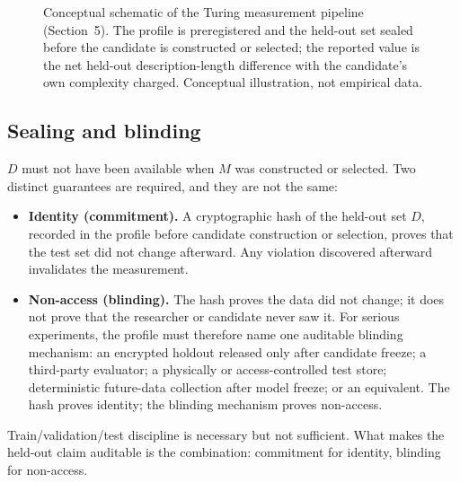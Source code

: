 \documentclass[11pt]{article}
\begin{document}
\begin{figure}[htbp]
\centering
{}
\caption{Conceptual schematic of the Turing measurement pipeline (Section~5). The profile is preregistered and the held-out set sealed before the candidate is constructed or selected; the reported value is the net held-out description-length difference with the candidate's own complexity charged. Conceptual illustration, not empirical data.}
\label{fig:pipeline}
\end{figure}


\subsection{Sealing and blinding}

\(D\) must not have been available when \(M\) was constructed or selected. Two distinct guarantees are required, and they are not the same:
\begin{itemize}
\item \textbf{Identity (commitment).} A cryptographic hash of the held-out set \(D\), recorded in the profile before candidate construction or selection, proves that the test set did not change afterward. Any violation discovered afterward invalidates the measurement.
\item \textbf{Non-access (blinding).} The hash proves the data did not change; it does not prove that the researcher or candidate never saw it. For serious experiments, the profile must therefore name one auditable blinding mechanism: an encrypted holdout released only after candidate freeze; a third-party evaluator; a physically or access-controlled test store; deterministic future-data collection after model freeze; or an equivalent. The hash proves identity; the blinding mechanism proves non-access.
\end{itemize}
Train/validation/test discipline is necessary but not sufficient. What makes the held-out claim auditable is the combination: commitment for identity, blinding for non-access.
\end{document}
